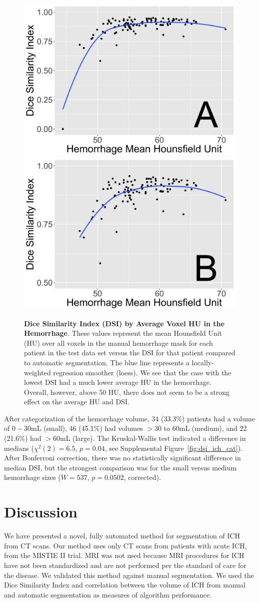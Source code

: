 \documentclass{elsarticle_nonatbib}\usepackage[]{graphicx}\usepackage[]{color}
\begin{document}
\begin{figure}
\centering
\includegraphics[width=0.48\linewidth,keepaspectratio]{DSI_By_Mean_HU_A.png}
\includegraphics[width=0.48\linewidth,keepaspectratio]{DSI_By_Mean_HU_B.png}
\caption{{\bf Dice Similarity Index (DSI) by Average Voxel HU in the Hemorrhage}. These values represent the mean Hounsfield Unit (HU) over all voxels in the manual hemorrhage mask for each patient in the test data set versus the DSI for that patient compared to automatic segmentation.  The blue line represents a locally-weighted regression smoother (loess).  We see that the case with the lowest DSI had a much lower average HU in the hemorrhage.  Overall, however, above 50 HU, there does not seem to be a strong effect on the average HU and DSI.}
\label{fig:dsi_hu}
\end{figure}





After categorization of the hemorrhage volume, 34 (33.3\%) patients had a volume of $0-30$mL (small), 46 (45.1\%) had volumes $> 30$ to $60$mL (medium), and 22 (21.6\%) had $>60$mL (large).  The Kruskal-Wallis test indicated a difference in medians ($\chi^2(2) = 6.5
$, $p = 0.04$, see Supplemental Figure~\ref{fig:dsi_ich_cat}).  After Bonferroni correction, there was no statistically significant difference in median DSI, but the strongest comparison was for the small versus medium hemorrhage sizes ($W = 537
$, $p = 0.0502$, corrected).


\section{Discussion}
We have presented a novel, fully automated method for segmentation of ICH from CT scans. Our method uses only CT scans from patients with acute ICH, from the MISTIE II trial. MRI was not
used because MRI procedures for ICH have not been standardized and are not performed per the standard of care for the disease. We validated this method against manual segmentation.  We used the Dice Similarity Index and correlation between the volume of ICH from manual and automatic segmentation as measures of algorithm performance.
\end{document}

